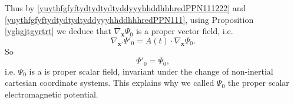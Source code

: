 \documentclass{article}
\theoremstyle{definition}
\theoremstyle{remark}
\renewcommand{\vec}[1]{\mathbf{#1}}
\newcommand{\er}{\eqref}
\newcommand{\er}{\eqref}
\begin{document}
Thus by \er{yuythfgfyftydtydtydtyddyyyhhddhhhredPPN111222} and
\er{yuythfgfyftydtydtydtyddyyyhhddhhhredPPN111}, using Proposition
\ref{yghgjtgyrtrt}
we deduce that $\nabla_{\vec
x}\Psi_0$ is a proper vector field, i.e.
\begin{equation}\label{vhfffngghhjghhgPPNghghghuigigg}
\nabla_{\vec x'}\Psi'_0=A(t)\cdot\nabla_{\vec x}\Psi_0.
\end{equation}
So
\begin{equation}\label{vhfffngghhjghhgPPNghghghutghffohjh}
\Psi'_0=\Psi_0,
\end{equation}
i.e. $\Psi_0$ is a is proper scalar field, invariant under the
change of non-inertial cartesian coordinate systems. This explains
why we called $\Psi_0$ the proper scalar electromagnetic potential.
%
%
%
\begin{comment}
On the other hand, by \er{apfrm7} and \er{vhfffngghPPN} using
\er{apfrm6} we deduce
\begin{multline}\label{vhfffngghhjghhgPPN}
\nabla_{\vec x}\left(\frac{1}{c}\vec A\cdot\vec v-\Psi\right)=
\frac{1}{c}\nabla_{\vec x}\left(\vec A\cdot\vec v\right)+\vec
D+\frac{1}{c}\frac{\partial\vec A}{\partial t}-\frac{1}{c}\vec
v\times curl_{\vec x}\vec A\\=\frac{1}{c}\nabla_{\vec x}\left(\vec
A\cdot\vec v\right)+\vec D+\frac{1}{c}\frac{\partial\vec A}{\partial
t}+\frac{1}{c}d_{\vec x}\vec A\cdot\vec v-\frac{1}{c}\left\{d_{\vec
x}\vec A\right\}^T\cdot\vec v\\=\vec D+\frac{1}{c}\frac{\partial\vec
A}{\partial t}+\frac{1}{c}d_{\vec x}\vec A\cdot\vec v+
\frac{1}{c}\left\{d_{\vec x}\vec v\right\}^T\cdot\vec A=\vec
D+\frac{1}{c}\frac{\partial\vec A}{\partial t}+\frac{1}{c}d_{\vec
x}\vec A\cdot\vec v-\frac{1}{c}d_{\vec x}\vec v\cdot\vec A+
\frac{1}{c}\left(d_{\vec x}\vec v+\left\{d_{\vec x}\vec
v\right\}^T\right)\cdot\vec A\\= \vec
D+\frac{1}{c}\left(\frac{\partial\vec A}{\partial t}-curl_{\vec
x}\left(\vec v\times\vec A\right)+\left(div_{\vec x}\vec
A\right)\vec v\right)-\frac{1}{c}\left(div_{\vec x}\vec v\right)\vec
A+ \frac{1}{c}\left(d_{\vec x}\vec v+\left\{d_{\vec x}\vec
v\right\}^T\right)\cdot\vec A.
\end{multline}
Thus by \er{vhfffngghhjghhgPPN} and
\er{yuythfgfyftydtydtydtyddyyyhhddhhhredPPN111222}, using
Proposition \ref{yghgjtgyrtrt}
we deduce
\begin{equation}\label{vhfffngghhjghhgPPNghghgh}
\nabla_{\vec x'}\left(\frac{1}{c}\vec A'\cdot\vec
v'-\Psi'\right)=A(t)\cdot\nabla_{\vec x}\left(\frac{1}{c}\vec
A\cdot\vec v-\Psi\right)
\end{equation}
So
\begin{equation}\label{vhfffngghhjghhgPPNghghghutghff}
\left(\frac{1}{c}\vec A'\cdot\vec
v'-\Psi'\right)=\left(\frac{1}{c}\vec A\cdot\vec v-\Psi\right),
\end{equation}
i.e. the scalar field $\zeta:=\left(\frac{1}{c}\vec A'\cdot\vec
v'-\Psi'\right)$ is proper scalar field, invariant under the change
of non-inertial cartesian coordinate systems.
\end{comment}
\end{document}
